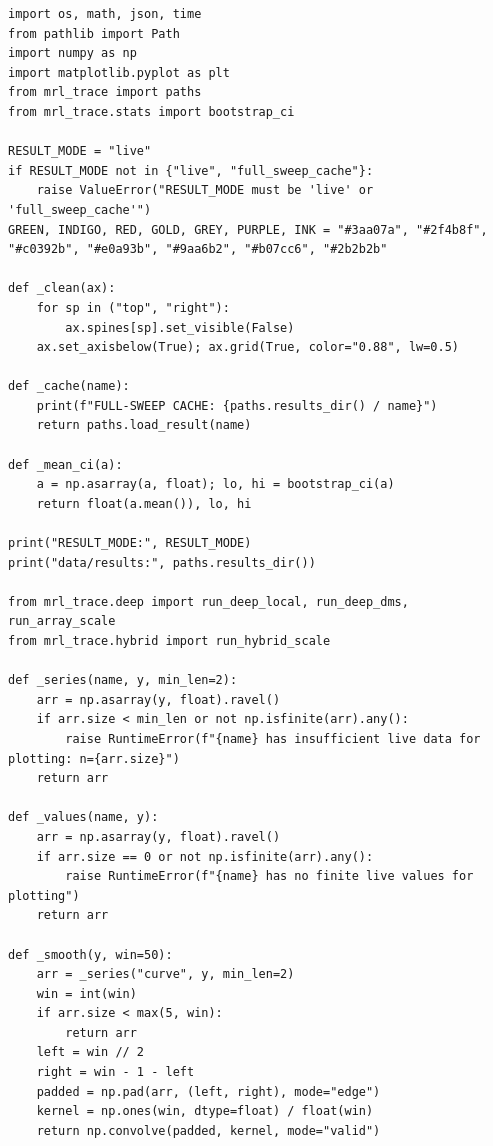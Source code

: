 \begin{lstlisting}[caption={03\_deep\_local\_learning.ipynb code cell 1},label={lst:mrl-nb-03-deep-local-learning-1}]
import os, math, json, time
from pathlib import Path
import numpy as np
import matplotlib.pyplot as plt
from mrl_trace import paths
from mrl_trace.stats import bootstrap_ci

RESULT_MODE = "live"
if RESULT_MODE not in {"live", "full_sweep_cache"}:
    raise ValueError("RESULT_MODE must be 'live' or 'full_sweep_cache'")
GREEN, INDIGO, RED, GOLD, GREY, PURPLE, INK = "#3aa07a", "#2f4b8f", "#c0392b", "#e0a93b", "#9aa6b2", "#b07cc6", "#2b2b2b"

def _clean(ax):
    for sp in ("top", "right"):
        ax.spines[sp].set_visible(False)
    ax.set_axisbelow(True); ax.grid(True, color="0.88", lw=0.5)

def _cache(name):
    print(f"FULL-SWEEP CACHE: {paths.results_dir() / name}")
    return paths.load_result(name)

def _mean_ci(a):
    a = np.asarray(a, float); lo, hi = bootstrap_ci(a)
    return float(a.mean()), lo, hi

print("RESULT_MODE:", RESULT_MODE)
print("data/results:", paths.results_dir())

from mrl_trace.deep import run_deep_local, run_deep_dms, run_array_scale
from mrl_trace.hybrid import run_hybrid_scale

def _series(name, y, min_len=2):
    arr = np.asarray(y, float).ravel()
    if arr.size < min_len or not np.isfinite(arr).any():
        raise RuntimeError(f"{name} has insufficient live data for plotting: n={arr.size}")
    return arr

def _values(name, y):
    arr = np.asarray(y, float).ravel()
    if arr.size == 0 or not np.isfinite(arr).any():
        raise RuntimeError(f"{name} has no finite live values for plotting")
    return arr

def _smooth(y, win=50):
    arr = _series("curve", y, min_len=2)
    win = int(win)
    if arr.size < max(5, win):
        return arr
    left = win // 2
    right = win - 1 - left
    padded = np.pad(arr, (left, right), mode="edge")
    kernel = np.ones(win, dtype=float) / float(win)
    return np.convolve(padded, kernel, mode="valid")
\end{lstlisting}


